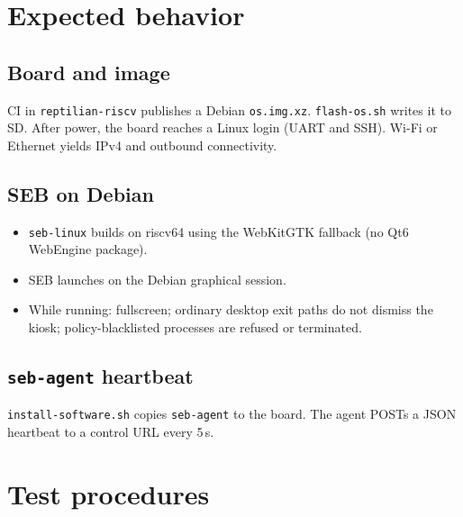 \documentclass[11pt]{article}
\newcommand{\todo}{\textit{TODO}}
\begin{document}
\section{Expected behavior}


\subsection{Board and image}
\label{sec:eb-boot}

CI in \texttt{reptilian-riscv} publishes a Debian \texttt{os.img.xz}. \texttt{flash-os.sh} writes it to SD. After power, the board reaches a Linux login (UART and SSH). Wi-Fi or Ethernet yields IPv4 and outbound connectivity.

\subsection{SEB on Debian}
\label{sec:eb-seb}

\begin{itemize}\setlength{\itemsep}{0.12em}
  \item \texttt{seb-linux} builds on riscv64 using the WebKitGTK fallback (no Qt6 WebEngine package).
  \item SEB launches on the Debian graphical session.
  \item While running: fullscreen; ordinary desktop exit paths do not dismiss the kiosk; policy-blacklisted processes are refused or terminated.
\end{itemize}


\subsection{\texttt{seb-agent} heartbeat}
\label{sec:eb-hb}

\texttt{install-software.sh} copies \texttt{seb-agent} to the board. The agent POSTs a JSON heartbeat to a control URL every 5\,s.

\section{Test procedures}
\label{sec:proc}
\end{document}
